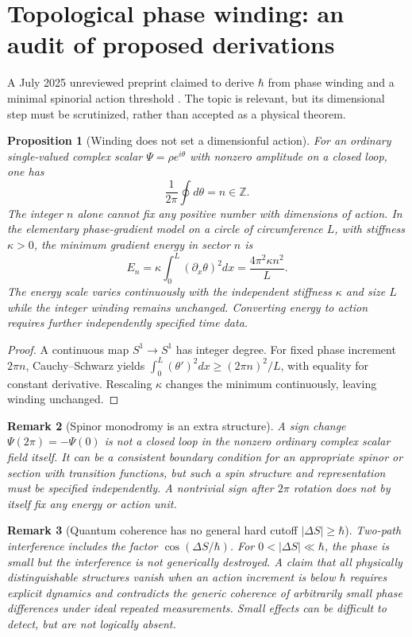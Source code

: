\documentclass[11pt,a4paper]{article}
\newtheorem{proposition}{Proposition}[section]
\newtheorem{remark}[proposition]{Remark}
\newcommand{\h}{\hbar}
\newcommand{\Z}{\mathbb Z}
\begin{document}
\section{Topological phase winding: an audit of proposed derivations}
A July 2025 unreviewed preprint claimed to derive $\h$ from phase winding and a minimal spinorial action threshold \cite{Altunin}. The topic is relevant, but its dimensional step must be scrutinized, rather than accepted as a physical theorem.
\begin{proposition}[Winding does not set a dimensionful action]\label{pr:winding}
For an ordinary single-valued complex scalar $\Psi=\rho e^{i\theta}$ with nonzero amplitude on a closed loop, one has
\begin{equation}\label{eq:winding}
 \frac1{2\pi}\oint d\theta=n\in\Z.
\end{equation}
The integer $n$ alone cannot fix any positive number with dimensions of action. In the elementary phase-gradient model on a circle of circumference $L$, with stiffness $\kappa>0$, the minimum gradient energy in sector $n$ is
\begin{equation}\label{eq:stiffness}
 E_n=\kappa\int_0^L (\partial_x\theta)^2dx
 =\frac{4\pi^2\kappa n^2}{L}.
\end{equation}
The energy scale varies continuously with the \emph{independent} stiffness $\kappa$ and size $L$ while the integer winding remains unchanged. Converting energy to action requires further independently specified time data.
\end{proposition}
\begin{proof} A continuous map $S^1\to S^1$ has integer degree. For fixed phase increment $2\pi n$, Cauchy--Schwarz yields $\int_0^L(\theta')^2dx\ge(2\pi n)^2/L$, with equality for constant derivative. Rescaling $\kappa$ changes the minimum continuously, leaving winding unchanged.\end{proof}
\begin{remark}[Spinor monodromy is an extra structure]
A sign change $\Psi(2\pi)=-\Psi(0)$ is not a closed loop in the nonzero \emph{ordinary complex scalar} field itself. It can be a consistent boundary condition for an appropriate spinor or section with transition functions, but such a spin structure and representation must be specified independently. A nontrivial sign after $2\pi$ rotation does not by itself fix any energy or action unit.
\end{remark}
\begin{remark}[Quantum coherence has no general hard cutoff $|\Delta S|\ge\h$]
Two-path interference includes the factor $\cos(\Delta S/\h)$. For $0<|\Delta S|\ll\h$, the phase is small but the interference is not generically destroyed. A claim that all physically distinguishable structures vanish when an action increment is below $\h$ requires explicit dynamics and contradicts the generic coherence of arbitrarily small phase differences under ideal repeated measurements. Small effects can be difficult to detect, but are not logically absent.
\end{remark}
\end{document}
